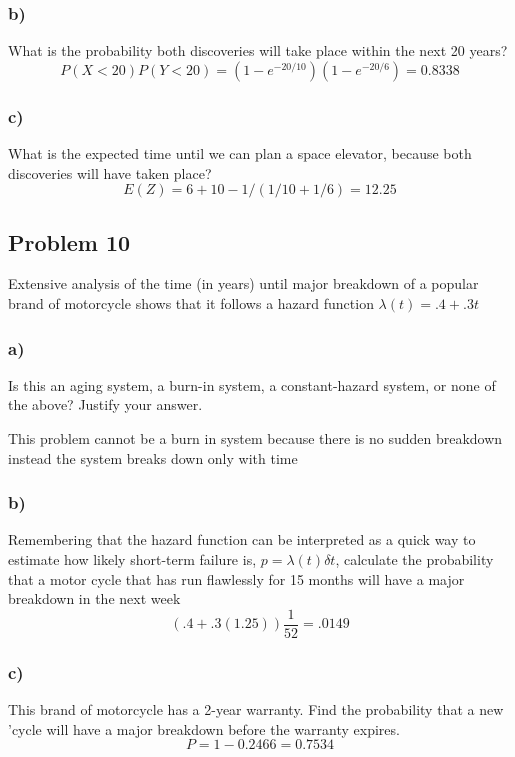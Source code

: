 \documentclass{article}
\begin{document}
\subsubsection*{b)}
What is the probability both discoveries will take place within the next 20 years?
\begin{equation}
    P(X < 20)P(Y < 20) = (1 - e^{-20/10})(1 - e^{-20/6}) = \boxed{0.8338}
\end{equation}
\subsubsection*{c)}
What is the expected time until we can plan a space elevator, because both discoveries will have taken place?
\begin{equation}
    E(Z) = 6 + 10 - 1/(1/10 + 1/6) = \boxed{12.25}
\end{equation}
\newpage
\subsection*{Problem 10} 
Extensive analysis of the time (in years) until major breakdown of a popular brand of motorcycle shows that it follows a hazard function $\lambda(t) = .4 + .3t$
\subsubsection*{a)}
Is this an aging system, a burn-in system, a constant-hazard system, or none of the above? Justify your answer.
\begin{center}
    This problem cannot be a burn in system because there is no sudden breakdown instead the system breaks down only with time
\end{center}
\subsubsection*{b)}
Remembering that the hazard function can be interpreted as a quick way to estimate how likely short-term failure is, $p= \lambda(t)\delta t$, calculate the probability that a motor cycle that has run flawlessly for 15 months will have a major breakdown in the next week
\begin{equation}
    (.4 + .3(1.25))\frac{1}{52} = \boxed{.0149}
\end{equation}
\subsubsection*{c)}
This brand of motorcycle has a 2-year warranty. Find the probability that a new 'cycle will have a major breakdown before the warranty expires.
\begin{equation}
    P = 1 - 0.2466 = \boxed{0.7534}
\end{equation}
\end{document}
